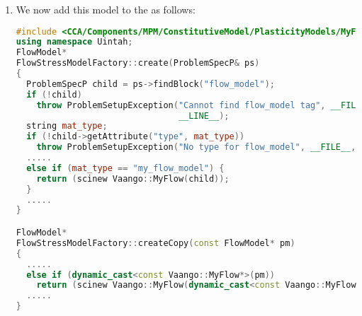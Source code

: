 \begin{enumerate}
\begin{lstlisting}[language=Cpp]
void
MyFlow::allocateCMDataAdd(Uintah::DataWarehouse* new_dw, Uintah::ParticleSubset* addset, Uintah::ParticleLabelVariableMap* newState, Uintah::ParticleSubset* delset, Uintah::DataWarehouse* old_dw)
{
  Uintah::ParticleVariable<double> n_internalVar1, n_internalVar2;
  Uintah::constParticleVariable<double> o_internalVar1, o_internalVar2;

  new_dw->allocateTemporary(n_internalVar1, addset);
  new_dw->allocateTemporary(n_internalVar2, addset);

  new_dw->get(o_internalVar1 , pInternalVar1Label_preReloc, delset);
  new_dw->get(o_internalVar2 , pInternalVar2Label_preReloc, delset);

  ParticleSubset::iterator o,n = addset->begin();
  for (o = delset->begin(); o != delset->end(); o++, n++) {
    n_internalVar1[*n] = o_internalVar1[*o];
    n_internalVar2[*n] = o_internalVar2[*o];
  }

  (*newState)[pInternalVar1Label] = n_internalVar1.clone();
  (*newState)[pInternalVar2Label] = n_internalVar2.clone();
}

void
MyFlow::updateElastic(const Uintah::particleIndex pidx)
{
  pInternalVar1_new[idx] = pInternalVar1[idx];
  pInternalVar2_new[idx] = pInternalVar2[idx];
}

void
MyFlow::updatePlastic(const particleIndex pidx, const double& someValue)
{
  pInternalVar1_new[idx] = pInternalVar1_new[idx];
  pInternalVar2_new[idx] = pInternalVar2_new[idx] + someValue;
}
\end{lstlisting}

  \item We now add this model to the  as follows:
\begin{lstlisting}[language=Cpp]
#include <CCA/Components/MPM/ConstitutiveModel/PlasticityModels/MyFlow.h>
using namespace Uintah;
FlowModel*
FlowStressModelFactory::create(ProblemSpecP& ps)
{
  ProblemSpecP child = ps->findBlock("flow_model");
  if (!child)
    throw ProblemSetupException("Cannot find flow_model tag", __FILE__,
                                __LINE__);
  string mat_type;
  if (!child->getAttribute("type", mat_type))
    throw ProblemSetupException("No type for flow_model", __FILE__, __LINE__);
  .....
  else if (mat_type == "my_flow_model") {
    return (scinew Vaango::MyFlow(child));
  }
  .....
}

FlowModel*
FlowStressModelFactory::createCopy(const FlowModel* pm)
{
  .....
  else if (dynamic_cast<const Vaango::MyFlow*>(pm))
    return (scinew Vaango::MyFlow(dynamic_cast<const Vaango::MyFlow*>(pm)));
  .....
}
\end{lstlisting}


\end{enumerate}
